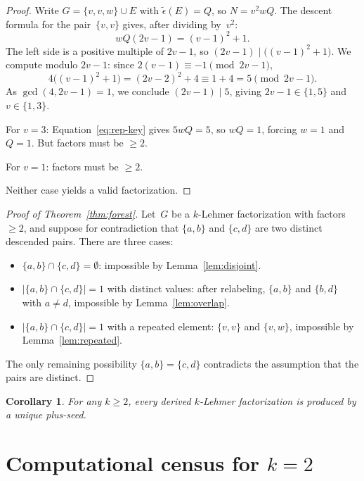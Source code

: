 \documentclass[11pt]{article}
\newtheorem{corollary}[theorem]{Corollary}
\theoremstyle{definition}
\theoremstyle{remark}
\newcommand{\eps}{\tilde{\epsilon}}
\begin{document}
\begin{proof}
Write $G = \{v, v, w\} \cup E$ with $\eps(E) = Q$, so $N = v^2 wQ$.  The
descent formula for the pair~$\{v,v\}$ gives, after dividing by~$v^2$:
\begin{equation}\label{eq:rep-key}
  wQ(2v-1) = (v-1)^2 + 1.
\end{equation}
The left side is a positive multiple of $2v - 1$, so
$(2v-1) \mid \bigl((v-1)^2 + 1\bigr)$.  We compute modulo $2v-1$: since
$2(v-1) \equiv -1 \pmod{2v-1}$,
\[
  4\bigl((v-1)^2 + 1\bigr) = (2v-2)^2 + 4 \equiv 1 + 4 = 5 \pmod{2v-1}.
\]
As $\gcd(4, 2v-1) = 1$, we conclude $(2v-1) \mid 5$, giving
$2v - 1 \in \{1, 5\}$ and $v \in \{1, 3\}$.

For $v = 3$: Equation~\eqref{eq:rep-key} gives $5wQ = 5$, so $wQ = 1$,
forcing $w = 1$ and $Q = 1$.  But factors must be $\ge 2$.

For $v = 1$: factors must be $\ge 2$.

Neither case yields a valid factorization.
\end{proof}


\begin{proof}[Proof of Theorem~\ref{thm:forest}]
Let~$G$ be a $k$-Lehmer factorization with factors $\ge 2$, and suppose
for contradiction that $\{a,b\}$ and $\{c,d\}$ are two distinct descended
pairs.  There are three cases:
\begin{itemize}
  \item $\{a,b\} \cap \{c,d\} = \emptyset$: impossible by
    Lemma~\ref{lem:disjoint}.
  \item $|\{a,b\} \cap \{c,d\}| = 1$ with distinct values: after
    relabeling, $\{a,b\}$ and $\{b,d\}$ with $a \ne d$, impossible by
    Lemma~\ref{lem:overlap}.
  \item $|\{a,b\} \cap \{c,d\}| = 1$ with a repeated element: $\{v,v\}$
    and $\{v,w\}$, impossible by Lemma~\ref{lem:repeated}.
\end{itemize}
The only remaining possibility $\{a,b\} = \{c,d\}$ contradicts the
assumption that the pairs are distinct.
\end{proof}

\begin{corollary}\label{cor:unique-seed}
For any $k \ge 2$, every derived $k$-Lehmer factorization is produced
by a unique plus-seed.
\end{corollary}


\section{Computational census for $k = 2$}
\end{document}
